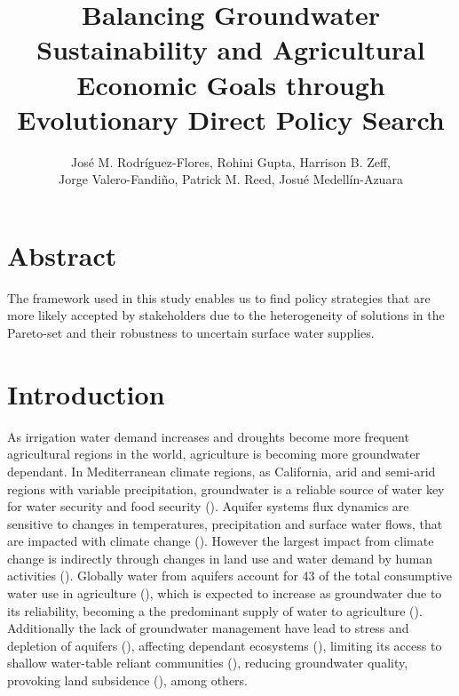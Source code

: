 \documentclass[11pt,a4paper]{article}
\title{Balancing Groundwater Sustainability and Agricultural Economic Goals through Evolutionary Direct Policy Search}
\author{José M. Rodríguez-Flores, Rohini Gupta, Harrison B. Zeff,  \\ Jorge Valero-Fandiño, Patrick M. Reed, Josué Medellín-Azuara}
\date{}
\begin{document}
\maketitle


\section*{Abstract}

The framework used in this study enables us to find policy strategies that are more likely accepted by stakeholders due to the heterogeneity of solutions in the Pareto-set and their robustness to uncertain surface water supplies. 
 
\section{Introduction}

As irrigation water demand increases and droughts become more frequent agricultural regions in the world, agriculture is becoming more groundwater dependant. In Mediterranean climate regions, as California, arid and semi-arid regions with variable precipitation, groundwater is a reliable source of water key for water security and food security (\cite{priyan_issues_2021,malmgren_groundwater_2022}). Aquifer systems flux dynamics are sensitive to changes in temperatures, precipitation and surface water flows, that are impacted with climate change (\cite{clifton_water_2010,cuthbert_global_2019}). However the largest impact from climate change is indirectly through changes in land use and water demand by human activities (\cite{taylor_ground_2013}). Globally water from aquifers account for 43 of the total consumptive water use in agriculture (\cite{siebert_groundwater_2010}), which is expected to increase as groundwater due to its reliability, becoming a the predominant supply of water to agriculture (\cite{wada_nonsustainable_2012}). Additionally the lack of groundwater management have lead to stress and depletion of aquifers (\cite{dalin_groundwater_2017, wada_global_2010}), affecting dependant ecosystems (\cite{bierkens_non-renewable_2019}), limiting its access to shallow water-table reliant communities (\cite{perrone_dry_2017}), reducing groundwater quality, provoking land subsidence (\cite{bagheri-gavkosh_land_2021}), among others.
\end{document}
